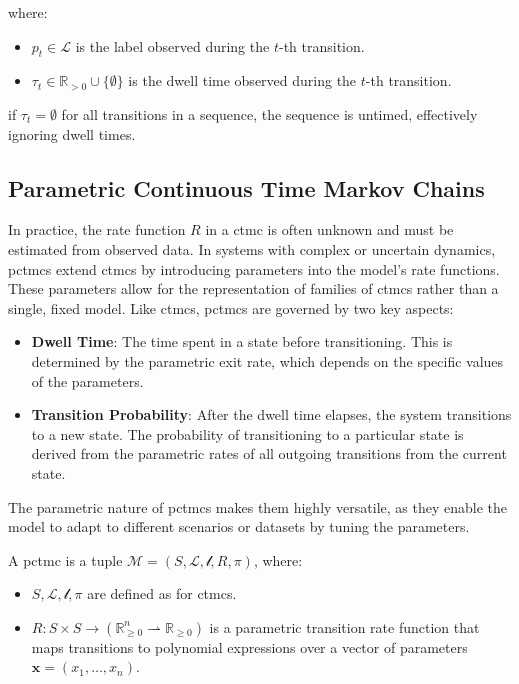 where:
\begin{itemize}
    \item $p_t \in \mathcal{L}$ is the label observed during the $t$-th transition.
    \item $\tau_t \in \mathbb{R}_{>0} \cup \{\emptyset\}$ is the dwell time observed during the $t$-th transition.
\end{itemize}
if $\tau_t = \emptyset$ for all transitions in a sequence, the sequence is untimed, effectively ignoring dwell times.

\subsection{Parametric Continuous Time Markov Chains}\label{subsec:parametric-ctmc}
In practice, the rate function $R$ in a \gls{ctmc} is often unknown and must be estimated from observed data.
In systems with complex or uncertain dynamics, \glspl{pctmc} extend \glspl{ctmc} by introducing parameters into the model's rate functions. These parameters allow for the representation of families of \glspl{ctmc} rather than a single, fixed model. Like \glspl{ctmc}, \glspl{pctmc} are governed by two key aspects:
\begin{itemize}
    \item \textbf{Dwell Time}: The time spent in a state before transitioning. This is determined by the parametric exit rate, which depends on the specific values of the parameters.
    \item \textbf{Transition Probability}: After the dwell time elapses, the system transitions to a new state. The probability of transitioning to a particular state is derived from the parametric rates of all outgoing transitions from the current state.
\end{itemize}

The parametric nature of \glspl{pctmc} makes them highly versatile, as they enable the model to adapt to different scenarios or datasets by tuning the parameters.

\begin{definition} 
    A \gls{pctmc} is a tuple $\mathcal{M} = (S, \mathcal{L}, \mathscr{l}, R, \pi)$, where: 
    \begin{itemize} 
        \item $S, \mathcal{L}, \mathscr{l}, \pi$ are defined as for \glspl{ctmc}. 
        \item $R: S \times S \rightarrow (\mathbb{R}_{\geq 0}^n \rightharpoonup \mathbb{R}_{\geq 0})$ is a parametric transition rate function that maps transitions to polynomial expressions over a vector of parameters $\mathbf{x} = (x_1, \dots, x_n)$. 
    \end{itemize} 
\end{definition}

